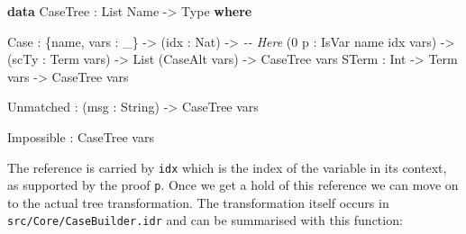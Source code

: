 \documentclass[
]{article}
\newenvironment{Shaded}{}{}
\newcommand{\CommentTok}[1]{\textcolor[rgb]{0.38,0.63,0.69}{\textit{#1}}}
\newcommand{\DataTypeTok}[1]{\textcolor[rgb]{0.56,0.13,0.00}{#1}}
\newcommand{\DecValTok}[1]{\textcolor[rgb]{0.25,0.63,0.44}{#1}}
\newcommand{\KeywordTok}[1]{\textcolor[rgb]{0.00,0.44,0.13}{\textbf{#1}}}
\newcommand{\NormalTok}[1]{#1}
\newcommand{\OperatorTok}[1]{\textcolor[rgb]{0.40,0.40,0.40}{#1}}
\newcommand{\OtherTok}[1]{\textcolor[rgb]{0.00,0.44,0.13}{#1}}
\begin{document}
\begin{Shaded}
\begin{Highlighting}[]
  \KeywordTok{data} \DataTypeTok{CaseTree} \OperatorTok{:} \DataTypeTok{List} \DataTypeTok{Name} \OtherTok{{-}\textgreater{}} \DataTypeTok{Type} \KeywordTok{where}

       \DataTypeTok{Case} \OperatorTok{:}\NormalTok{ \{name, vars }\OperatorTok{:}\NormalTok{ \_\} }\OtherTok{{-}\textgreater{}}
\NormalTok{              (idx }\OperatorTok{:} \DataTypeTok{Nat}\NormalTok{) }\OtherTok{{-}\textgreater{}} \CommentTok{{-}{-} Here}
\NormalTok{              (}\DecValTok{0}\NormalTok{ p }\OperatorTok{:} \DataTypeTok{IsVar}\NormalTok{ name idx vars) }\OtherTok{{-}\textgreater{}}
\NormalTok{              (scTy }\OperatorTok{:} \DataTypeTok{Term}\NormalTok{ vars) }\OtherTok{{-}\textgreater{}} \DataTypeTok{List}\NormalTok{ (}\DataTypeTok{CaseAlt}\NormalTok{ vars) }\OtherTok{{-}\textgreater{}}
              \DataTypeTok{CaseTree}\NormalTok{ vars}
       \DataTypeTok{STerm} \OperatorTok{:} \DataTypeTok{Int} \OtherTok{{-}\textgreater{}} \DataTypeTok{Term}\NormalTok{ vars }\OtherTok{{-}\textgreater{}} \DataTypeTok{CaseTree}\NormalTok{ vars}

       \DataTypeTok{Unmatched} \OperatorTok{:}\NormalTok{ (msg }\OperatorTok{:} \DataTypeTok{String}\NormalTok{) }\OtherTok{{-}\textgreater{}} \DataTypeTok{CaseTree}\NormalTok{ vars}

       \DataTypeTok{Impossible} \OperatorTok{:} \DataTypeTok{CaseTree}\NormalTok{ vars}
\end{Highlighting}
\end{Shaded}

The reference is carried by \texttt{idx} which is the index of the
variable in its context, as supported by the proof \texttt{p}. Once we
get a hold of this reference we can move on to the actual tree
transformation. The transformation itself occurs in
\texttt{src/Core/CaseBuilder.idr} and can be summarised with this
function:
\end{document}

